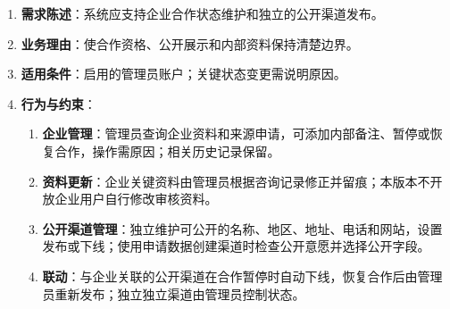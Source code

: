 \begin{enumerate}
\item {\bfseries 需求陈述}：系统应支持企业合作状态维护和独立的公开渠道发布。
\item {\bfseries 业务理由}：使合作资格、公开展示和内部资料保持清楚边界。
\item {\bfseries 适用条件}：启用的管理员账户；关键状态变更需说明原因。
\item {\bfseries 行为与约束}：
\begin{enumerate}
\item {\bfseries 企业管理}：管理员查询企业资料和来源申请，可添加内部备注、暂停或恢复合作，操作需原因；相关历史记录保留。
\item {\bfseries 资料更新}：企业关键资料由管理员根据咨询记录修正并留痕；本版本不开放企业用户自行修改审核资料。
\item {\bfseries 公开渠道管理}：独立维护可公开的名称、地区、地址、电话和网站，设置发布或下线；使用申请数据创建渠道时检查公开意愿并选择公开字段。
\item {\bfseries 联动}：与企业关联的公开渠道在合作暂停时自动下线，恢复合作后由管理员重新发布；独立独立渠道由管理员控制状态。
\end{enumerate}

\end{enumerate}


